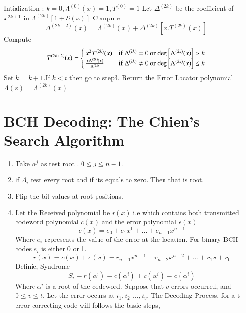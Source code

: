 \documentclass[journal,12pt,twocolumn]{IEEEtran}
\renewcommand\thesection{\arabic{section}}
\begin{document}
 Intialization : $k=0, \Lambda^{(0)}(x)=1,T^{(0)}=1$
 Let $\Delta^{(2k)}$ be the coefficient of $x^{2k+1}$ in $\Lambda^{(2k)}[1+S(x)]$ 
 Compute  
\begin{equation}
\Delta^{(2k+2)}(x)=\Lambda^{(2k)}(x) +\Delta^{(2k)}[x.T^{(2k)}(x)]
\end{equation}
 Compute \begin{equation}
    	T^{(2k+2)}(x) =
    \begin{cases}
    	x^2T^{(2k)}(x) & \text{if $\Delta^{(2k)}=0$ or deg}{}\left[\Lambda^{(2k)}(x)\right]>k\\
      \frac{x \Lambda^{(2k)}(x)}{\Delta^{(2k)}} & \text{if $\Delta^{(2k)}\neq 0$ or 
deg}{}\left[\Lambda^{(2k)}(x)\right]\leq k
    \end{cases}
  \end{equation}
 Set $k=k+1$.If $k<t$ then go to step3.
 Return the Error Locator polynomial $\Lambda(x)=\Lambda^{(2k)}(x)$

\section{BCH Decoding: The Chien's Search Algorithm}
\begin{enumerate}[label=\thesection.\arabic*
,ref=\thesection.\theenumi]
\item Take $\alpha ^j$ as test root . $0\leq j \leq n-1$.
\item if $\Lambda_i $ test every root and if its equals to zero. Then that is root.
\item  Flip the bit values at root positions.
\item Let the Received polynomial be $r(x)$ i.e which contains both transmitted codeword polynomial $c(x)$ and 
the 
error polynomial $e(x)$ \begin{equation}
e(x)=e_0+e_1x^1+...+e_{n-1}x^{n-1}
\end{equation} Where $e_i$ represents the value of the error at the location. For binary BCH codes  $e_i$ is 
either 0 or 1.
\begin{equation}
r(x)=c(x)+e(x)=r_{n-1}x^{n-1}+r_{n-2}x^{n-2}+\dots+r_1x+r_0
\end{equation}
Definie, Syndrome \begin{equation}
S_i=r(\alpha^i)=c(\alpha^i)+e(\alpha^i)=e(\alpha^i)
\end{equation} Where $\alpha^i $ is a root of the codeword.
Suppose that $v$ errors occurred, and $0\leq v \leq t$.
Let the error occurs at $i_1,i_2,\dots,i_v$. 
The Decoding Process, for a t-error correcting code will follows the basic steps,
\end{enumerate}
\end{document}
